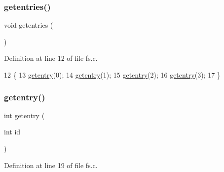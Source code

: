 \subsubsection{\texorpdfstring{getentries()}{getentries()}}
{\footnotesize\ttfamily void getentries (\begin{DoxyParamCaption}{ }\end{DoxyParamCaption})}



Definition at line 12 of file fs.\+c.


\begin{DoxyCode}
12                   \{
13     \hyperlink{a00149_a3fb32d07d3bd05144a196c94fc59c0d1_a3fb32d07d3bd05144a196c94fc59c0d1}{getentry}(0);
14     \hyperlink{a00149_a3fb32d07d3bd05144a196c94fc59c0d1_a3fb32d07d3bd05144a196c94fc59c0d1}{getentry}(1);
15     \hyperlink{a00149_a3fb32d07d3bd05144a196c94fc59c0d1_a3fb32d07d3bd05144a196c94fc59c0d1}{getentry}(2);
16     \hyperlink{a00149_a3fb32d07d3bd05144a196c94fc59c0d1_a3fb32d07d3bd05144a196c94fc59c0d1}{getentry}(3);
17 \}
\end{DoxyCode}
\mbox{\label{a00149_a3fb32d07d3bd05144a196c94fc59c0d1_a3fb32d07d3bd05144a196c94fc59c0d1}} 
\subsubsection{\texorpdfstring{getentry()}{getentry()}}
{\footnotesize\ttfamily int getentry (\begin{DoxyParamCaption}\item[{int}]{id }\end{DoxyParamCaption})}



Definition at line 19 of file fs.\+c.


